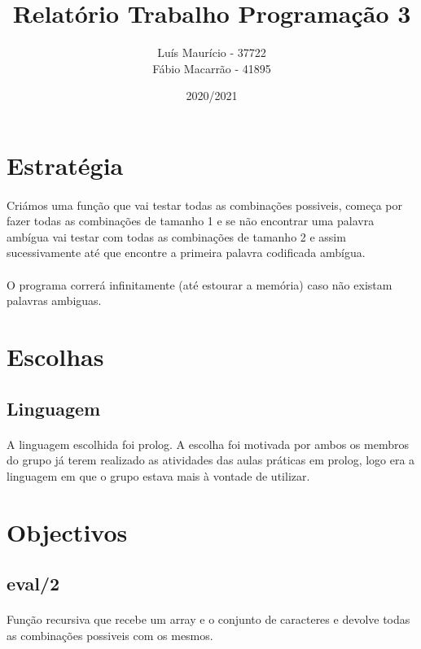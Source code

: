 \documentclass[11pt]{article}
\title{Relatório Trabalho Programação 3}
\author{Luís Maurício - 37722\\Fábio Macarrão - 41895\\}
\date{2020/2021}
\begin{document}
	\maketitle

	\newpage
	
	\section{Estratégia}
	\paragraph{}
	Criámos uma função que vai testar todas as combinações possiveis, começa por fazer todas as combinações de tamanho 1 e se não encontrar uma palavra ambígua vai testar com todas as combinações de tamanho 2 e assim sucessivamente até que encontre a primeira palavra codificada ambígua.
	\paragraph{}
	O programa correrá infinitamente (até estourar a memória) caso não existam palavras ambiguas.
	
	\section{Escolhas}
	\subsection{Linguagem}
	\paragraph{}
	A linguagem escolhida foi prolog.
	A escolha foi motivada por ambos os membros do grupo já terem realizado as atividades das aulas práticas em prolog, logo era a linguagem em que o grupo estava mais à vontade de utilizar.
	\section{Objectivos}
	\subsection{eval/2}
	\paragraph{}
	Função recursiva que recebe um array e o conjunto de caracteres e devolve todas as combinações possiveis com os mesmos.
	
\end{document}
